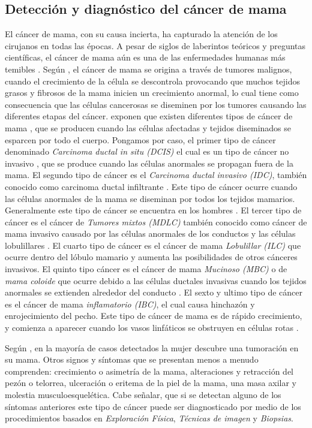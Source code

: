\subsection{Detección y diagnóstico del cáncer de mama}
El cáncer de mama, con su causa incierta, ha capturado la atención de los cirujanos en todas las épocas. A pesar de siglos de laberintos teóricos y preguntas científicas, el cáncer de mama aún es una de las enfermedades humanas más temibles \cite{Bland2009}. Según \cite{Fatima2020}, el cáncer de mama se origina a través de tumores malignos, cuando el crecimiento de la célula se descontrola provocando que muchos tejidos grasos y fibrosos de la mama inicien un crecimiento anormal, lo cual tiene como consecuencia que las células cancerosas se diseminen por los tumores causando las diferentes etapas del cáncer. \cite{Fatima2020} exponen que existen diferentes tipos de cáncer de mama \cite{Sun2017}, que se producen cuando las células afectadas y tejidos diseminados se esparcen por todo el cuerpo. Pongamos por caso, el primer tipo de cáncer denominado \textit{Carcinoma ductal in situ (DCIS)} el cual es un tipo de cáncer no invasivo \cite{Hou2020}, que se produce cuando las células anormales se propagan fuera de la mama. El segundo tipo de cáncer es el \textit{Carcinoma ductal invasivo (IDC)}, también conocido como carcinoma ductal infiltrante \cite{Chaudhury2011}. Este tipo de cáncer ocurre cuando las células anormales de la mama se diseminan por todos los tejidos mamarios. Generalmente este tipo de cáncer se encuentra en los hombres \cite{Page1982}. El tercer tipo de cáncer es el cáncer de \textit{Tumores mixtos (MDLC)} también conocido como cáncer de mama invasivo \cite{Tuck1997} causado por las células anormales de los conductos y las células lobulillares \cite{Lee2017}. El cuarto tipo de cáncer es el cáncer de mama \textit{Lobulillar (ILC)} \cite{Masciari2007} que ocurre dentro del lóbulo mamario y aumenta las posibilidades de otros cánceres invasivos. El quinto tipo cáncer es el cáncer de mama \textit{Mucinoso (MBC)} o de \textit{mama coloide} \cite{Memis2000} que ocurre debido a las células ductales invasivas cuando los tejidos anormales se extienden alrededor del conducto \cite{Gradilone2011}. El sexto y ultimo tipo de cáncer es el cáncer de mama \textit{inflamatorio (IBC)}, el cual causa hinchazón y enrojecimiento del pecho. Este tipo de cáncer de mama es de rápido crecimiento, y comienza a aparecer cuando los vasos linfáticos se obstruyen en células rotas \cite{Robertson2010}.

Según \cite{Brunicardi2010}, en la mayoría de casos detectados la mujer descubre una tumoración en su mama. Otros signos y síntomas que se presentan menos a menudo comprenden: crecimiento o asimetría de la mama, alteraciones y retracción del pezón o telorrea, ulceración o eritema de la piel de la mama, una masa axilar y molestia musculoesquelética. Cabe señalar, que si se detectan alguno de los síntomas anteriores este tipo de cáncer puede ser diagnosticado por medio de los procedimientos basados en \textit{Exploración Física}, \textit{Técnicas de imagen} y \textit{Biopsias}. 

